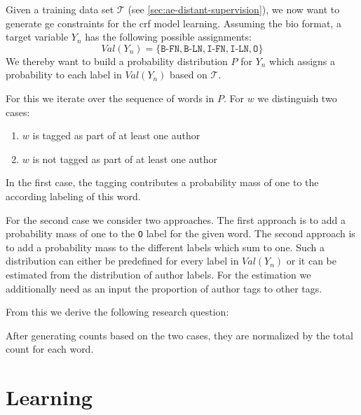 \bigskip

Given a training data set $\mathcal{T}$ (see \cref{sec:ae-distant-supervision}), we now want to generate \gls{ge} constraints for the \gls{crf} model learning.
Assuming the \gls{bio} format, a \gls{target variable} $Y_n$ has the following possible assignments:
\begin{equation*}
  Val(Y_n)=\{\texttt{B-FN},\texttt{B-LN},\texttt{I-FN},\texttt{I-LN},\texttt{O}\}
\end{equation*}
We thereby want to build a \gls{probability distribution} $P$ for $Y_n$ which assigns a probability to each label in $Val(Y_n)$ based on $\mathcal{T}$.

For this we iterate over the sequence of words in $P$.
For $w$ we distinguish two cases:
\begin{enumerate}
  \item $w$ is tagged as part of at least one author
  \item $w$ is not tagged as part of at least one author
\end{enumerate}

In the first case, the tagging contributes a probability mass of one to the according labeling of this word.

For the second case we consider two approaches.
The first approach is to add a probability mass of one to the \texttt{O} label for the given word.
The second approach is to add a probability mass to the different labels which sum to one.
Such a distribution can either be predefined for every label in $Val(Y_n)$ or it can be estimated from the distribution of author labels.
For the estimation we additionally need as an input the proportion of author tags to other tags.


From this we derive the following research question:

\bigskip

After generating counts based on the two cases, they are normalized by the total count for each word.




\section{Learning }\label{sec:ae-learning-crfs}

